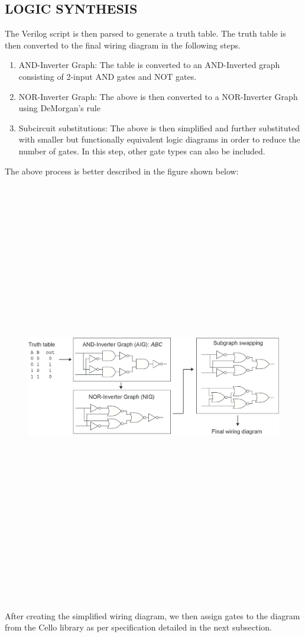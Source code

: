 \documentclass[11pt]{article}
\begin{document}
\subsection*{LOGIC SYNTHESIS}
The Verilog script is then parsed to generate a truth table. The truth table is then converted to the final wiring diagram in the following steps.
\begin{enumerate}
\item AND-Inverter Graph:
The table is converted to an AND-Inverted graph consisting of 2-input AND gates and NOT gates.
\item NOR-Inverter Graph:
The above is then converted to a NOR-Inverter Graph using DeMorgan's rule
\item Subcircuit substitutions:
The above is then simplified and further substituted with smaller but functionally equivalent logic diagrams in order to reduce the number of gates. In this step, other gate types can also be included.\cite{Cidarlab}
\end{enumerate}
The above process is better described in the figure shown below: 
\begin{figure}[ht!]
\centering
\includegraphics[width=18cm,height=18cm,keepaspectratio]{logic.png}
\label{Logic Synthesis}
\end{figure}
\\[\baselineskip]    
After creating the simplified wiring diagram, we then assign gates to the diagram from the Cello library as per specification detailed in the next subsection.
\end{document}
